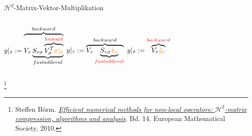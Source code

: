 \documentclass[10pt]{beamer}
\let\svthefootnote\thefootnote
\begin{document}
\begin{frame}{\(\mathcal{H}^2\)-Matrix-Vektor-Multiplikation}

  \begin{columns}
      \( y|_{\hat{\tau}} := \overbrace{V_{\tau} \underbrace{S_{\tau \sigma}
        \overbrace{V_{\sigma}^T
        \textcolor{orange}{x|_{\hat{\sigma}}}}^{\textcolor{red}{\text{forward}}}}_{fastaddeval}}^{backward} \)
      \( y|_{\hat{\tau}} := \overbrace{V_{\tau} \underbrace{S_{\tau \sigma}
         \textcolor{orange}{\hat{x}_\sigma}}_{\textcolor{red}{fastaddeval}}}^{backward} \)
      \( y|_{\hat{\tau}} := \overbrace{V_{\tau}
         \textcolor{orange}{\hat{y}_\tau}}^{\textcolor{red}{backward}} \)
  \end{columns}
  \footnotesize
  \let\thefootnote\relax\footnote{Steffen B{\"o}rm.
  \href{https://books.google.de/books/about/Efficient_Numerical_Methods_for_Non_loca.html?id=awMabNC9DTkC&redir_esc=y}
  {\textit{Efficient numerical methods for non-local operators: \(
   \mathcal{H}^{2} \)-matrix compression, algorithms and analysis}}. Bd. 14.  
   European Mathematical Society, 2010.}
  \addtocounter{footnote}{-1}\let\thefootnote\svthefootnote\relax
  \normalsize
\end{frame}
\end{document}
